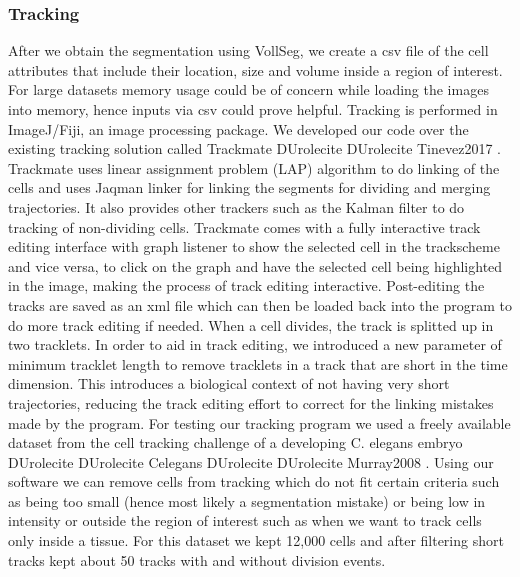 \documentclass[letterpaper,compsoc,twoside]{IEEEtran}
\providecommand*{\DUrole}[2]{%
  \ifcsname DUrole#1\endcsname%
    \csname DUrole#1\endcsname{#2}%
  \else%
    #2%
  \fi%
}
\begin{document}
\subsubsection{Tracking%
  \label{tracking}%
}
After we obtain the segmentation using VollSeg, we create a csv file of the cell attributes that include their location, size and volume inside a region of interest. For large datasets memory usage could be of concern while loading the images into memory, hence inputs via csv could prove helpful. Tracking is performed in ImageJ/Fiji, an image processing package. We developed our code over the existing tracking solution called Trackmate \DUrole{cite}{Tinevez2017}. Trackmate uses linear assignment  problem (LAP) algorithm to do linking of the cells and uses Jaqman linker for linking the segments for dividing and merging trajectories. It also provides other trackers such as the Kalman filter to do tracking of non-dividing cells. Trackmate comes with a fully interactive track editing interface with graph listener to show the selected cell in the trackscheme and vice versa, to click on the graph and have the selected cell being highlighted in the image, making the process of track editing interactive. Post-editing the tracks are saved as an xml file which can then be loaded back into the program to do more track editing if needed. When a cell divides, the track is splitted up in two tracklets. In order to aid in track editing, we introduced a new parameter of minimum tracklet length to remove tracklets in a track that are short in the time dimension. This introduces a biological context of not having very short trajectories, reducing the track editing effort to correct for the linking mistakes made by the program. For testing our tracking program we used a freely available dataset from the cell tracking challenge of a developing C. elegans embryo \DUrole{cite}{Celegans} \DUrole{cite}{Murray2008}. Using our software we can remove cells from tracking which do not fit certain criteria such as being too small (hence most likely a segmentation mistake) or being low in intensity or outside the region of interest such as when we want to track cells only inside a tissue. For this dataset we kept 12,000 cells and after filtering short tracks kept about 50 tracks with and without division events.
\end{document}
